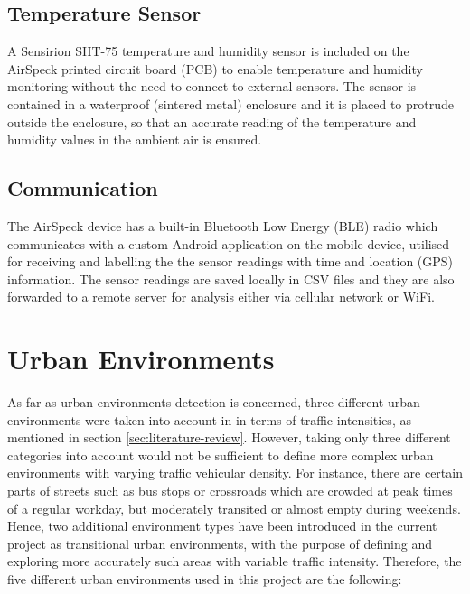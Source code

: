 \documentclass[bsc,frontabs,twoside,singlespacing, parskip,deptreport]{infthesis}     %
\begin{document}
\subsection*{Temperature Sensor}

A Sensirion SHT-75 temperature and humidity sensor \cite{sensirion} is included on the AirSpeck printed circuit board (PCB) to enable temperature and humidity monitoring without the need to connect to external sensors. The sensor is contained in a waterproof (sintered metal) enclosure \cite{airspeck} and it is placed to protrude outside the enclosure, so that an accurate reading of the temperature and humidity values in the ambient air is ensured.


\subsection*{Communication}

The AirSpeck device has a built-in Bluetooth Low Energy (BLE) radio which communicates with a custom Android application on the mobile device, utilised for receiving and labelling the the sensor readings with time and location (GPS) information. The sensor readings are saved locally in CSV files and they are also forwarded to a remote server for analysis either via cellular network or WiFi.

\section{Urban Environments}
\label{sec:urban-environments}

As far as urban environments detection is concerned, three different urban environments were taken into account in \cite{rome2017} in terms of traffic intensities, as mentioned in section \ref{sec:literature-review}. However, taking only three different categories into account would not be sufficient to define more complex urban environments with varying traffic vehicular density. For instance, there are certain parts of streets such as bus stops or crossroads which are crowded at peak times of a regular workday, but moderately transited or almost empty during weekends. Hence, two additional environment types have been introduced in the current project as transitional urban environments, with the purpose of defining and exploring more accurately such areas with variable traffic intensity. Therefore, the five different urban environments used in this project are the following:
\end{document}
